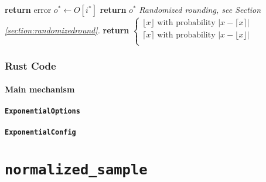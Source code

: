 \documentclass[11pt]{article}
\newcommand{\LineComment}[1]{\Statex \textit{#1}}
\theoremstyle{definition}
\begin{document}
\begin{algorithm}[H]
\begin{algorithmic}[1]
        \State \textbf{return} error 
    \EndIf
    \State $o^* \leftarrow O[i^*]$ 
    \State \textbf{return} $o^*$
    \EndProcedure
    \LineComment{Randomized rounding, see Section \ref{section:randomizedround}.}
    \State \textbf{return} $  \begin{cases}
\lfloor{x} \rfloor \text{ with probability } |x-\lceil{x} \rceil|\\
\lceil{x} \rceil \text{ with probability } |x-\lfloor{ x} \rfloor|\\
\end{cases} $
    \EndFunction
  \end{algorithmic}
\end{algorithm}




\subsubsection{Rust Code}
 \paragraph{Main mechanism}


\paragraph{{\tt ExponentialOptions}}\phantom{   }



\paragraph{{\tt ExponentialConfig}}
\phantom{   }



\section{\texttt{normalized\_sample}}\label{section:normalizedsample}
\end{document}
